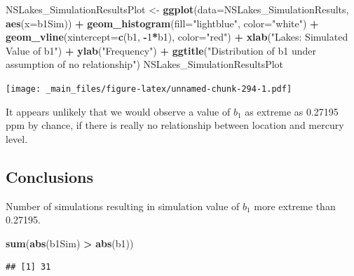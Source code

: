 \documentclass[]{book}
\newenvironment{Shaded}{\begin{snugshade}}{\end{snugshade}}
\newcommand{\KeywordTok}[1]{\textcolor[rgb]{0.13,0.29,0.53}{\textbf{#1}}}
\newcommand{\DataTypeTok}[1]{\textcolor[rgb]{0.13,0.29,0.53}{#1}}
\newcommand{\DecValTok}[1]{\textcolor[rgb]{0.00,0.00,0.81}{#1}}
\newcommand{\StringTok}[1]{\textcolor[rgb]{0.31,0.60,0.02}{#1}}
\newcommand{\OperatorTok}[1]{\textcolor[rgb]{0.81,0.36,0.00}{\textbf{#1}}}
\newcommand{\NormalTok}[1]{#1}
\begin{document}
\begin{Shaded}
\begin{Highlighting}[]
\NormalTok{NSLakes_SimulationResultsPlot <-}\StringTok{ }\KeywordTok{ggplot}\NormalTok{(}\DataTypeTok{data=}\NormalTok{NSLakes_SimulationResults, }\KeywordTok{aes}\NormalTok{(}\DataTypeTok{x=}\NormalTok{b1Sim)) }\OperatorTok{+}\StringTok{ }
\StringTok{  }\KeywordTok{geom_histogram}\NormalTok{(}\DataTypeTok{fill=}\StringTok{"lightblue"}\NormalTok{, }\DataTypeTok{color=}\StringTok{"white"}\NormalTok{) }\OperatorTok{+}\StringTok{ }
\StringTok{  }\KeywordTok{geom_vline}\NormalTok{(}\DataTypeTok{xintercept=}\KeywordTok{c}\NormalTok{(b1, }\OperatorTok{-}\DecValTok{1}\OperatorTok{*}\NormalTok{b1), }\DataTypeTok{color=}\StringTok{"red"}\NormalTok{) }\OperatorTok{+}\StringTok{ }
\StringTok{  }\KeywordTok{xlab}\NormalTok{(}\StringTok{"Lakes: Simulated Value of b1"}\NormalTok{) }\OperatorTok{+}\StringTok{ }\KeywordTok{ylab}\NormalTok{(}\StringTok{"Frequency"}\NormalTok{) }\OperatorTok{+}\StringTok{ }
\StringTok{  }\KeywordTok{ggtitle}\NormalTok{(}\StringTok{"Distribution of b1 under assumption of no relationship"}\NormalTok{)}
\NormalTok{NSLakes_SimulationResultsPlot}
\end{Highlighting}
\end{Shaded}

\texttt{[image: \_main\_files/figure-latex/unnamed-chunk-294-1.pdf]}

It appears unlikely that we would observe a value of \(b_1\) as extreme
as 0.27195 ppm by chance, if there is really no relationship between
location and mercury level.

\subsection{Conclusions}\label{conclusions}

Number of simulations resulting in simulation value of \(b_1\) more
extreme than 0.27195.

\begin{Shaded}
\begin{Highlighting}[]
\KeywordTok{sum}\NormalTok{(}\KeywordTok{abs}\NormalTok{(b1Sim) }\OperatorTok{>}\StringTok{ }\KeywordTok{abs}\NormalTok{(b1))}
\end{Highlighting}
\end{Shaded}

\begin{verbatim}
## [1] 31
\end{verbatim}
\end{document}
